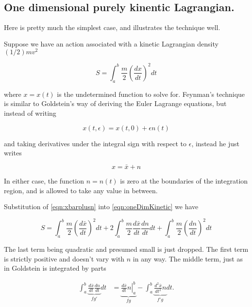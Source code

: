 \documentclass{article}
\begin{document}
\subsection{ One dimensional purely kinentic Lagrangian. }

Here is pretty much the simplest case, and illustrates the technique well.

Suppose we have an action associated with a kinetic Lagrangian density $(1/2) m v^2$

\begin{equation}\label{eqn:oneDimKinetic}
S = \int_a^b \frac{m}{2} { \left(\frac{dx}{dt}\right) }^2 dt
\end{equation}

where $x = x(t)$ is the undetermined function to solve for.  Feynman's technique is similar to Goldstein's way of deriving the Euler Lagrange equations, but instead of writing

\begin{equation*}
x(t, \epsilon) = x(t, 0) + \epsilon n(t)
\end{equation*}

and taking derivatives under the integral sign with respect to $\epsilon$, instead he just writes

\begin{equation}\label{eqn:xbarplusn}
x = \bar{x} + n
\end{equation}

In either case, the function $n = n(t)$ is zero at the boundaries of the integration region, and is allowed to take any value in between.

Substitution of \ref{eqn:xbarplusn} into \ref{eqn:oneDimKinetic} we have

\begin{equation}
S = 
\int_a^b \frac{m}{2} { \left(\frac{d\bar{x}}{dt}\right) }^2 dt
+ 2 \int_a^b \frac{m}{2} \frac{d\bar{x}}{dt} \frac{d n}{dt} dt
+ \int_a^b \frac{m}{2} { \left(\frac{d n}{dt}\right) }^2 dt
\end{equation}

The last term being quadratic and presumed small is just dropped.  The first term is strictly positive and doesn't vary with $n$ in any way.  The middle term, just as in 
Goldstein is integrated by parts

\begin{align*}
\int_a^b \underbrace{ \frac{d\bar{x}}{dt} \frac{d n}{dt} }_{fg'} dt
&= \underbrace{ \left. \frac{d\bar{x}}{dt} n \right\vert_a^b }_{fg} - \int_a^b \underbrace{\frac{d^2\bar{x}}{dt^2} n}_{f'g} dt.
\end{align*}
\end{document}
